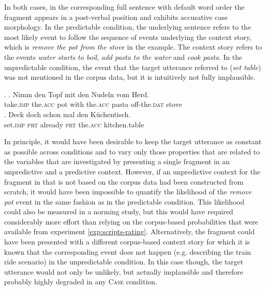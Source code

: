 In both cases, in the corresponding full sentence \Next with default word order the fragment appears in a post-verbal position and exhibits accusative case morphology. In the predictable condition, the underlying sentence \Next[a] refers to the most likely event to follow the sequence of events underlying the context story, which is \textit{remove the pot from the stove} in the example. The context story refers to the events \textit{water starts to boil}, \textit{add pasta to the water} and \textit{cook pasta}. In the unpredictable condition, the event that the target utterance \Next[b] referred to (\textit{set table}) was not mentioned in the corpus data, but it is intuitively not fully implausible.     
     
\ex. \ag. Nimm  den Topf mit den Nudeln vom Herd.\\
	  take.\textsc{imp} the.\textsc{acc} pot with the.\textsc{acc} pasta off-the.\textsc{dat} stove\\
     \bg. Deck doch schon mal den Küchentisch.\\
	  set.\textsc{imp} \textsc{prt} already \textsc{prt} the.\textsc{acc} kitchen.table\\

In principle, it would have been desirable to keep the target utterance as constant as possible across conditions and to vary only those properties that are related to the variables that are investigated by presenting a single fragment in an unpredictive and a predictive context. However, if an unpredictive context for the fragment in \LLast[a] that is not based on the corpus data had been constructed from scratch, it would have been impossible to quantify the likelihood of the \textit{remove pot} event in the same fashion as in the predictable condition. This likelihood could also be measured in a norming study, but this would have required considerably more effort than relying on the corpus-based probabilities that were available from experiment \ref{exp:scripts-rating}. Alternatively, the fragment could have been presented with a different corpus-based context story for which it is known that the corresponding event does not happen (e.g. describing the train ride scenario) in the unpredictable condition. In this case though, the target utterance would not only be unlikely, but actually implausible and therefore probably highly degraded in any \textsc{Case} condition.

